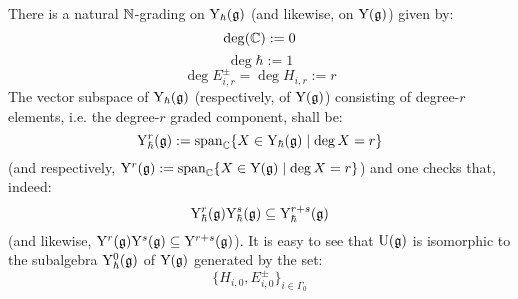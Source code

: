             \begin{remark} \label{remark: the_degree_grading_on_finite_type_yangians}
                There is a natural $\mathbb{N}$-grading on $\mathrm{Y}_{\hbar}(\mathfrak{g})$ (and likewise, on $\mathrm{Y}(\mathfrak{g})$) given by:
                    $$\deg(\mathbb{C}) := 0$$
                    $$\deg \hbar := 1$$
                    $$\deg E_{i, r}^{\pm} = \deg H_{i, r} := r$$
                The vector subspace of $\mathrm{Y}_{\hbar}(\mathfrak{g})$ (respectively, of $\mathrm{Y}(\mathfrak{g})$) consisting of degree-$r$ elements, i.e. the degree-$r$ graded component, shall be:
                    $$\mathrm{Y}^r_{\hbar}(\mathfrak{g}) := \operatorname{span}_{\mathbb{C}} \{ X \in \mathrm{Y}_{\hbar}(\mathfrak{g}) \mid \deg X = r \}$$
                (and respectively, $\mathrm{Y}^r(\mathfrak{g}) := \operatorname{span}_{\mathbb{C}} \{ X \in \mathrm{Y}(\mathfrak{g}) \mid \deg X = r \}$) and one checks that, indeed:
                    $$\mathrm{Y}^r_{\hbar}(\mathfrak{g}) \mathrm{Y}^s_{\hbar}(\mathfrak{g}) \subseteq \mathrm{Y}^{r + s}_{\hbar}(\mathfrak{g})$$
                (and likewise, $\mathrm{Y}^r(\mathfrak{g}) \mathrm{Y}^s(\mathfrak{g}) \subseteq \mathrm{Y}^{r + s}(\mathfrak{g})$). It is easy to see that $\mathrm{U}(\mathfrak{g})$ is isomorphic to the subalgebra $\mathrm{Y}^0_{\hbar}(\mathfrak{g})$ of $\mathrm{Y}(\mathfrak{g})$ generated by the set:
                    $$\{ H_{i, 0}, E_{i, 0}^{\pm} \}_{i \in \Gamma_0}$$
            \end{remark}

